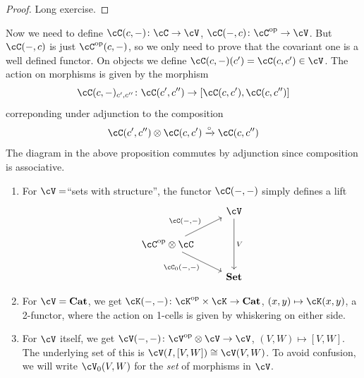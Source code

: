 \documentclass[a4paper,11pt,oneside,openany]{scrbook}
\begin{document}
\begin{proof}
	Long exercise.
\end{proof}
Now we need to define $ \cC(c,-) \from \cC \to \cV $, $ \cC(-,c)\from \cC^{\op}\to \cV $.
But $ \cC(-,c) $ is just $ \cC^{\op}(c,-) $, so we only need to prove that the covariant one is a well defined functor.
On objects we define $ \cC(c,-)(c') = \cC(c,c') \in \cV $.
The action on morphisms is given by the morphism
\begin{displaymath}
	\cC(c,-)_{c',c''} \from \cC(c',c'') \to [\cC(c,c'),\cC(c,c'')]
\end{displaymath}
correponding under adjunction to the composition
\begin{displaymath}
	\cC(c',c'')\otimes\cC(c,c')\xrightarrow{\circ}\cC(c,c'')
\end{displaymath}
The diagram in the above proposition commutes by adjunction since composition is associative.
\begin{exmp}
	\begin{enumerate}[label=\arabic*)]
		\item
		      For $ \cV =  $``sets with structure'', the functor $ \cC(-,-) $
              simply defines a lift
		      \begin{displaymath}
			      \begin{tikzcd}
				      & \cV \arrow[dd, "V"]\\
				      \cC^{\op}\otimes \cC \arrow[ur, "{\cC(-,-)}"]\arrow[dr, "{\cC_0(-,-)}"'] & \\
				      & \Set
			      \end{tikzcd}
		      \end{displaymath}
		\item
		      For $ \cV = \Cat $, we get $ \cK(-,-) \from \cK^{\op}\times \cK \to \Cat $, $ (x,y)\mapsto \cK(x,y) $,
		      a 2-functor, where the action on 1-cells is given by whiskering on either side.
		\item
		      For $ \cV $ itself, we get  $ \cV(-,-) \from \cV^{\op}\otimes \cV \to \cV $, $ (V,W)\mapsto [V,W] $.
		      The underlying set of this is $ \cV(I,[V,W]) \iso \cV(V,W) $.
		      To avoid confusion, we will write $ \cV_0(V,W) $ for the \emph{set} of morphisms in $ \cV $.
	\end{enumerate}
\end{exmp}
\end{document}
